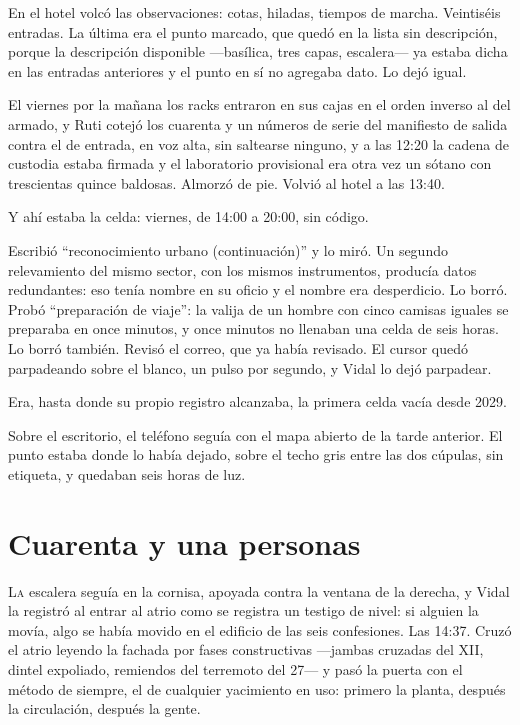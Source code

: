 En el hotel volcó las observaciones: cotas, hiladas, tiempos de marcha. Veintiséis entradas. La última era el punto marcado, que quedó en la lista sin descripción, porque la descripción disponible ---basílica, tres capas, escalera--- ya estaba dicha en las entradas anteriores y el punto en sí no agregaba dato. Lo dejó igual.

El viernes por la mañana los racks entraron en sus cajas en el orden inverso al del armado, y Ruti cotejó los cuarenta y un números de serie del manifiesto de salida contra el de entrada, en voz alta, sin saltearse ninguno, y a las 12:20 la cadena de custodia estaba firmada y el laboratorio provisional era otra vez un sótano con trescientas quince baldosas. Almorzó de pie. Volvió al hotel a las 13:40.

Y ahí estaba la celda: viernes, de 14:00 a 20:00, sin código.

Escribió ``reconocimiento urbano (continuación)'' y lo miró. Un segundo relevamiento del mismo sector, con los mismos instrumentos, producía datos redundantes: eso tenía nombre en su oficio y el nombre era desperdicio. Lo borró. Probó ``preparación de viaje'': la valija de un hombre con cinco camisas iguales se preparaba en once minutos, y once minutos no llenaban una celda de seis horas. Lo borró también. Revisó el correo, que ya había revisado. El cursor quedó parpadeando sobre el blanco, un pulso por segundo, y Vidal lo dejó parpadear.

Era, hasta donde su propio registro alcanzaba, la primera celda vacía desde 2029.

Sobre el escritorio, el teléfono seguía con el mapa abierto de la tarde anterior. El punto estaba donde lo había dejado, sobre el techo gris entre las dos cúpulas, sin etiqueta, y quedaban seis horas de luz.

\clearpage

\chapter{Cuarenta y una personas}

\lettrine[lines=2, lhang=0.1, nindent=0.2em]{L}{a} escalera seguía en la cornisa, apoyada contra la ventana de la derecha, y Vidal la registró al entrar al atrio como se registra un testigo de nivel: si alguien la movía, algo se había movido en el edificio de las seis confesiones. Las 14:37. Cruzó el atrio leyendo la fachada por fases constructivas ---jambas cruzadas del XII, dintel expoliado, remiendos del terremoto del 27--- y pasó la puerta con el método de siempre, el de cualquier yacimiento en uso: primero la planta, después la circulación, después la gente.


